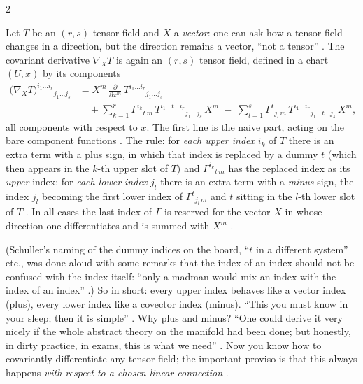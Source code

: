 \begin{paracol}{2}
\begin{definition}\label{def:cf-covariant-tensor}
Let $T$ be an $(r,s)$ tensor field and $X$ a \emph{vector}: one can ask how a tensor field changes in a direction, but the direction
remains a vector, ``not a tensor'' . The covariant derivative $\nabla_XT$ is again an $(r,s)$ tensor field,
defined in a chart $(U,x)$ by its components
\begin{align*}
  \bigl(\nabla_XT\bigr)^{i_1\dots i_r}{}_{j_1\dots j_s}
  &=X^m\,\frac{\partial}{\partial x^m}\,T^{i_1\dots i_r}{}_{j_1\dots j_s}\\
  &\quad+\sum_{k=1}^r\Gamma^{i_k}{}_{t\,m}\,T^{i_1\dots t\dots i_r}{}_{j_1\dots j_s}\,X^m
        \;-\;\sum_{l=1}^s\Gamma^{t}{}_{j_l\,m}\,T^{i_1\dots i_r}{}_{j_1\dots t\dots j_s}\,X^m ,
\end{align*}
all components with respect to $x$. The first line is the naive part, acting on the bare component functions .
The rule: for \emph{each upper index} $i_k$ of $T$ there is an extra term with a plus sign, in which that index is replaced by a dummy
$t$ (which then appears in the $k$-th upper slot of $T$) and $\Gamma^{i_k}{}_{t\,m}$ has the replaced index as its \emph{upper} index; for \emph{each lower index}
$j_l$ there is an extra term with a \emph{minus} sign, the index $j_l$ becoming the first lower index of
$\Gamma^{t}{}_{j_l\,m}$ and $t$ sitting in the $l$-th lower slot of $T$ . In all cases the last index of $\Gamma$ is
reserved for the vector $X$ in whose direction one differentiates and is summed with $X^m$ .
\end{definition}
(Schuller's naming of the dummy indices on the board, ``$t$ in a different system'' etc., was done aloud with some remarks that the
index of an index should not be confused with the index itself: ``only a madman would mix an index with the index of an index''
.)
So in short: every upper index behaves like a vector index (plus), every lower index like a covector index (minus). ``This you must
know in your sleep; then it is simple'' . Why plus and minus? ``One could derive it very nicely if the whole abstract
theory on the manifold had been done; but honestly, in dirty practice, in exams, this is what we need'' .
Now you know how to covariantly differentiate any tensor field; the important proviso is that this always happens
\emph{with respect to a chosen linear connection} .


\end{paracol}
